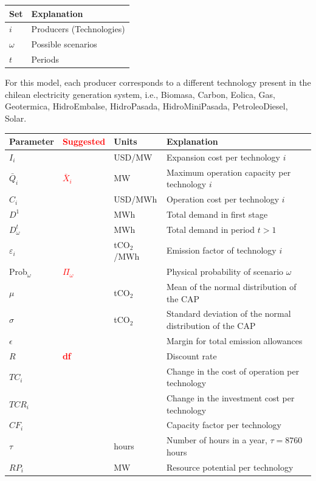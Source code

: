 \documentclass[11pt, letterpaper]{article}
\newcommand\boldred[1]{\textcolor{red}{\textbf{#1}}}
\begin{document}
\begin{center}
\begin{tabular}{ l l  } 
 \hline
 \textbf{Set} &  \textbf{Explanation} \\ 
 \hline
 \hline
 $i$ & Producers (Technologies) \\  
 $\omega$ & Possible scenarios \\ 
 $t$ & Periods \\
 \hline
\end{tabular}
\end{center}

For this model, each producer corresponds to a different technology present in the chilean electricity generation system, i.e., Biomasa, Carbon, Eolica, Gas, Geotermica, HidroEmbalse, HidroPasada, HidroMiniPasada, PetroleoDiesel, Solar.

\begin{center}
\begin{tabular}{  l l l l  } 
 \hline
 \textbf{Parameter} & \boldred{Suggested} & \textbf{Units} & \textbf{Explanation} \\ 
 \hline
 \hline
 $I_i$ & & USD/MW & Expansion cost per technology $i$ \\  
 $\bar{Q}_i$ & \boldred{$\bar{X}_i$} & MW & Maximum operation capacity per technology $i$  \\ 
 $C_i$ &  & USD/MWh & Operation cost per technology $i$ \\
 $D^{1}$ & & MWh & Total demand in first stage \\
 $D^{t}_{\omega}$ & & MWh & Total demand in period $t > 1$ \\
 $\varepsilon_i$ & & tCO$_{2}$/MWh  & Emission factor of technology $i$\\
 Prob$_\omega$ & \boldred{$\Pi_\omega$} & & Physical probability of scenario $\omega$ \\
 $\mu$ & & tCO$_{2}$ & Mean of the normal distribution of the CAP \\
  $\sigma$ & & tCO$_{2}$ & Standard deviation of the normal distribution of the CAP \\
  $\epsilon$ & &  & Margin for total emission allowances \\
  $R$ & \boldred{df} & & Discount rate \\
  $TC_i$ & & & Change in the cost of operation per technology \\
  $TCR_i$ & & & Change in the investment cost per technology \\
  $CF_i$ & & & Capacity factor per technology\\
  $\tau$ & & hours&  Number of hours in a year, $\tau=8760$ hours\\
  {\color{blue} $RP_i$ } & & {\color{blue} MW} & {\color{blue} Resource potential per technology }\\
\hline
\end{tabular}
\end{center}
\end{document}
